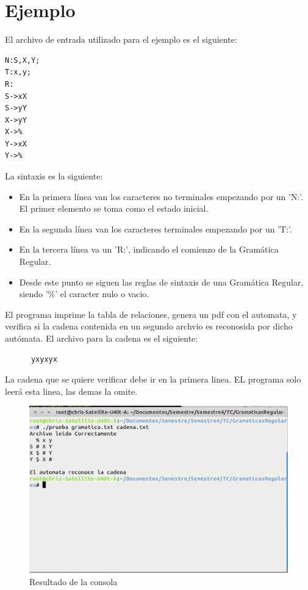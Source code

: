 \documentclass[a4paper,12pt]{article}
\begin{document}
  \section{Ejemplo}
    El archivo de entrada utilizado para el ejemplo es el siguiente:
    \begin{lstlisting}
N:S,X,Y;
T:x,y;
R:
S->xX
S->yY
X->yY
X->%
Y->xX
Y->%
    \end{lstlisting}
    La sintaxis es la siguiente:
    \begin{itemize}
     \item En la primera línea van los caracteres no terminales empezando por un 'N:'. El primer elemento se toma como el estado inicial.
     \item En la segunda línea van los caracteres terminales empezando por un 'T:'.
     \item En la tercera línea va un 'R:', indicando el comienzo de la Gramática Regular.
     \item Desde este punto se siguen las reglas de sintaxis de una Gramática Regular, siendo '\%' el caracter nulo o vacio.
    \end{itemize}
    El programa imprime la tabla de relaciones, genera un pdf con el automata, y verifica si la cadena contenida en un segundo archvio es reconosida por dicho autómata.
    El archivo para la cadena es el siguiente:
    \begin{lstlisting}
      yxyxyx
     \end{lstlisting}
    La cadena que se quiere verificar debe ir en la primera linea. EL programa solo leerá esta linea, las demas la omite.
    \begin{figure}[h]
     \centering
     \includegraphics[scale = 0.5]{consola2.eps}
     \caption{Resultado de la consola}
    \end{figure}
\end{document}
